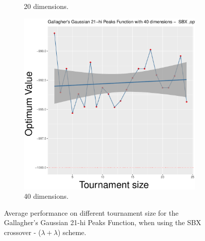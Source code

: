 \begin{figure}[t]
\begin{subfigure}[b]{0.33\textwidth}
		\caption{20 dimensions.}
	\end{subfigure}
	\begin{subfigure}[b]{0.33\textwidth}
		\centering
		\includegraphics[width=\textwidth]{img/2n2n-40D/multimodal_2n2n_22_dim_40.pdf}
		\caption{40 dimensions.}
	\end{subfigure}
	\caption{Average performance on different tournament size for the Gallagher's Gaussian 21-hi Peaks Function, when using the SBX crossover - ($\lambda + \lambda$) scheme.}
	\label{sbx-22-B}
\end{figure}


